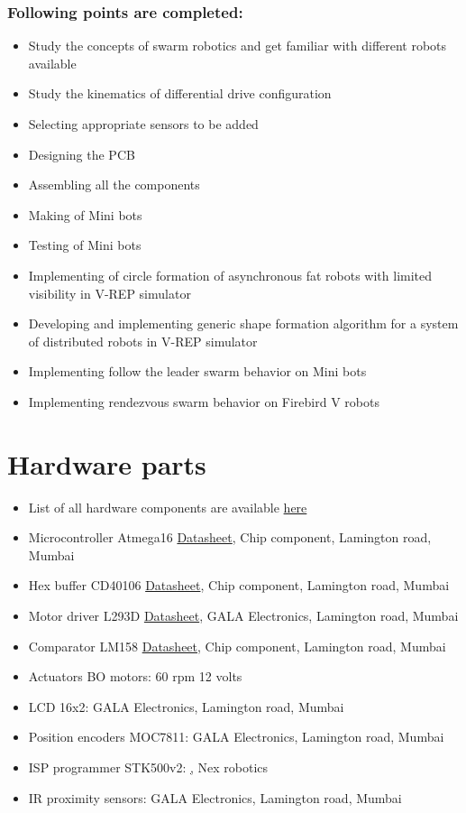 \documentclass[a4paper,12pt,oneside]{book}
\begin{document}
\subsection*{Following points are completed:}
\begin{itemize}
\item Study the concepts of swarm robotics and get familiar
with different robots available 
\item Study the kinematics of differential drive configuration 
\item Selecting appropriate sensors to be added 
\item Designing the PCB 
\item Assembling all the components 
\item Making of Mini bots 
\item Testing of Mini bots
\item Implementing of circle formation of asynchronous fat robots with limited visibility in V-REP simulator
\item Developing and implementing generic shape formation algorithm for a system of distributed robots in V-REP simulator
\item Implementing follow the leader swarm behavior on Mini bots
\item Implementing rendezvous swarm behavior on Firebird V robots
\end{itemize}

\chapter[Hardware parts]{Hardware parts}
\begin{itemize}
  \item List of all hardware components are available \href{./COMPONENT LIST/Small_robot_PCB_schematic_WITH_COST.pdf}{here} 
  \item Microcontroller Atmega16 \href{./datasheet/atmega16.pdf}{Datasheet}, {Chip component, Lamington road, Mumbai} 
  \item Hex buffer CD40106 \href{./datasheet/CD40106.pdf}{Datasheet}, {Chip component, Lamington road, Mumbai} 
  \item Motor driver L293D \href{./datasheet/L293.pdf}{Datasheet}, {GALA Electronics, Lamington road, Mumbai} 
  \item Comparator LM158 \href{./datasheet/lm158-n.pdf}{Datasheet}, {Chip component, Lamington road, Mumbai}
  \item Actuators BO motors: 60 rpm 12 volts	
  \item LCD 16x2: GALA Electronics, Lamington road, Mumbai
  \item Position encoders MOC7811: GALA Electronics, Lamington road, Mumbai
  \item ISP programmer STK500v2: \href{}, {Nex robotics}
  \item IR proximity sensors: GALA Electronics, Lamington road, Mumbai
\end{itemize}
\end{document}

